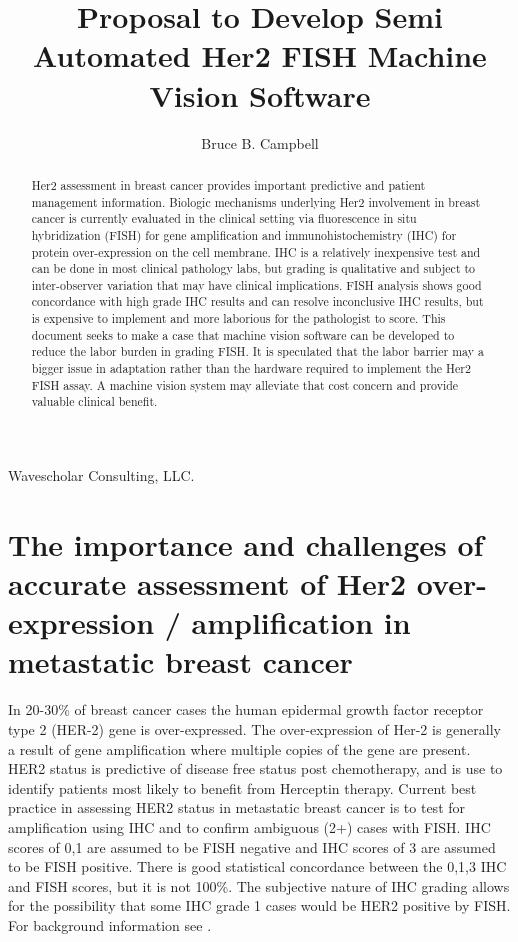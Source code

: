 \documentclass[10pt]{amsart}
\theoremstyle{definition}
\theoremstyle{remark}
\numberwithin{equation}{section}
\newlength{\defbaselineskip}
\begin{document}
\setlength{\baselineskip}{1.6 \defbaselineskip}
\title{Proposal to Develop Semi Automated Her2 FISH Machine Vision Software}%
\author{Bruce B. Campbell}%
{Wavescholar Consulting, LLC.}
%

\begin{abstract}
Her2 assessment in breast cancer provides important predictive and
patient management information.  Biologic mechanisms underlying
Her2 involvement in breast cancer is currently evaluated in the
clinical setting via fluorescence in situ hybridization (FISH) for
gene amplification and immunohistochemistry (IHC) for protein
over-expression on the cell membrane.  IHC is a relatively
inexpensive test and can be done in most clinical pathology labs,
but grading is qualitative and subject to inter-observer variation
that may have clinical implications. FISH analysis shows good
concordance with high grade IHC results and can resolve
inconclusive IHC results, but is expensive to implement and more
laborious for the pathologist to score.  This document seeks to
make a case that machine vision software can be developed to
reduce the labor burden in grading FISH.  It is speculated that
the labor barrier may a bigger issue in adaptation rather than the
hardware required to implement the Her2 FISH assay.  A machine
vision system may alleviate that cost concern and provide valuable
clinical benefit.

\end{abstract}

\maketitle

\tableofcontents

\section{The importance and challenges of accurate assessment of Her2
over-expression / amplification in metastatic breast cancer} In
20-30\% of breast cancer cases the human epidermal growth factor
receptor type 2 (HER-2) gene is over-expressed.  The
over-expression of Her-2 is generally a result of gene
amplification where multiple copies of the gene are present. HER2
status is predictive of disease free status post chemotherapy, and
is use to identify patients most likely to benefit from Herceptin
therapy. Current best practice in assessing HER2 status in
metastatic breast cancer is to test for amplification using IHC
and to confirm ambiguous (2+) cases with FISH.  IHC scores of 0,1
are assumed to be FISH negative and IHC scores of 3 are assumed to
be FISH positive.  There is good statistical concordance between
the 0,1,3 IHC and FISH scores, but it is not 100\%.  The
subjective nature of IHC grading allows for the possibility that
some IHC grade 1 cases would be HER2 positive by FISH. For
background information see \cite{2,3}.
\end{document}
